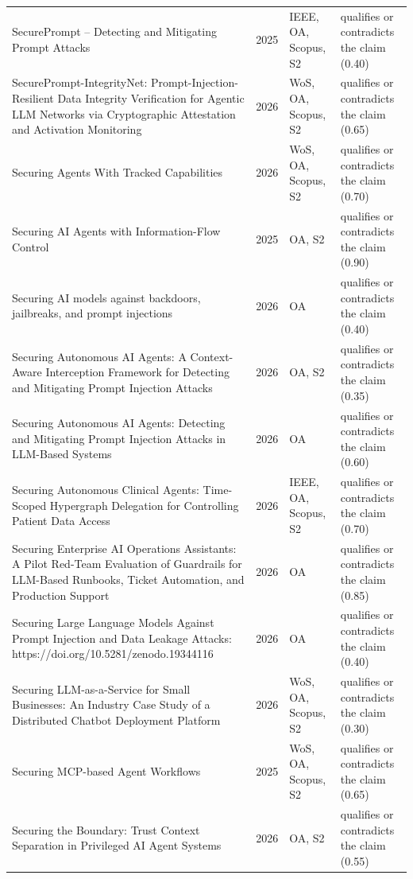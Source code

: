\begin{longtable}{@{}%
  >{\raggedright\arraybackslash}p{}c%
  >{\raggedright\arraybackslash}p{}%
  >{\raggedright\arraybackslash}p{}@{}}
SecurePrompt -- Detecting and Mitigating Prompt Attacks & 2025 & IEEE, OA, Scopus, S2 & qualifies or contradicts the claim (0.40) \\
SecurePrompt-IntegrityNet: Prompt-Injection-Resilient Data Integrity Verification for Agentic LLM Networks via Cryptographic Attestation and Activation Monitoring & 2026 & WoS, OA, Scopus, S2 & qualifies or contradicts the claim (0.65) \\
Securing Agents With Tracked Capabilities & 2026 & WoS, OA, Scopus, S2 & qualifies or contradicts the claim (0.70) \\
Securing AI Agents with Information-Flow Control & 2025 & OA, S2 & qualifies or contradicts the claim (0.90) \\
Securing AI models against backdoors, jailbreaks, and prompt injections & 2026 & OA & qualifies or contradicts the claim (0.40) \\
Securing Autonomous AI Agents: A Context-Aware Interception Framework for Detecting and Mitigating Prompt Injection Attacks & 2026 & OA, S2 & qualifies or contradicts the claim (0.35) \\
Securing Autonomous AI Agents: Detecting and Mitigating Prompt Injection Attacks in LLM-Based Systems & 2026 & OA & qualifies or contradicts the claim (0.60) \\
Securing Autonomous Clinical Agents: Time-Scoped Hypergraph Delegation for Controlling Patient Data Access & 2026 & IEEE, OA, Scopus, S2 & qualifies or contradicts the claim (0.70) \\
Securing Enterprise AI Operations Assistants: A Pilot Red-Team Evaluation of Guardrails for LLM-Based Runbooks, Ticket Automation, and Production Support & 2026 & OA & qualifies or contradicts the claim (0.85) \\
Securing Large Language Models Against Prompt Injection and Data Leakage Attacks: https://doi.org/10.5281/zenodo.19344116 & 2026 & OA & qualifies or contradicts the claim (0.40) \\
Securing LLM-as-a-Service for Small Businesses: An Industry Case Study of a Distributed Chatbot Deployment Platform & 2026 & WoS, OA, Scopus, S2 & qualifies or contradicts the claim (0.30) \\
Securing MCP-based Agent Workflows & 2025 & WoS, OA, Scopus, S2 & qualifies or contradicts the claim (0.65) \\
Securing the Boundary: Trust Context Separation in Privileged AI Agent Systems & 2026 & OA, S2 & qualifies or contradicts the claim (0.55) \\

\end{longtable}
